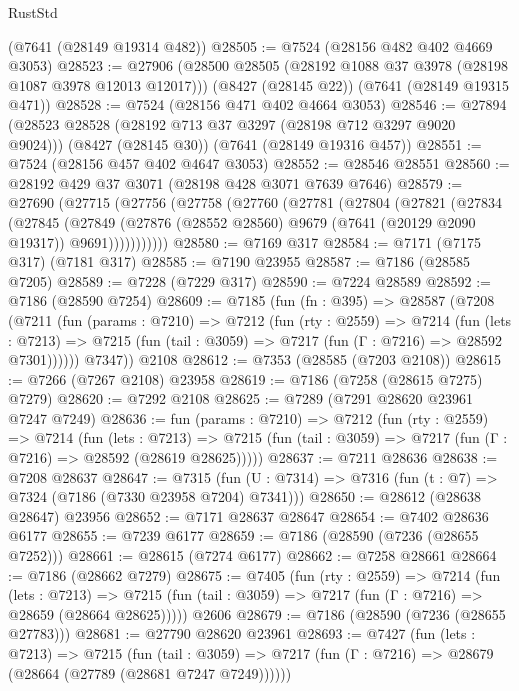 \begin{lexlean}{RustStd}
\begin{coremodule}
{\begin{coremodule}
{{{{{{{{{{{{{{{{{{{{{{{{{{{{{{{{    (@7641 (@28149 @19314 @482))
@28505 := @7524 (@28156 @482 @402 @4669 @3053)
@28523 := @27906
    (@28500 @28505 (@28192 @1088 @37 @3978 (@28198 @1087 @3978 @12013 @12017)))
    (@8427 (@28145 @22))
    (@7641 (@28149 @19315 @471))
@28528 := @7524 (@28156 @471 @402 @4664 @3053)
@28546 := @27894
    (@28523 @28528 (@28192 @713 @37 @3297 (@28198 @712 @3297 @9020 @9024)))
    (@8427 (@28145 @30))
    (@7641 (@28149 @19316 @457))
@28551 := @7524 (@28156 @457 @402 @4647 @3053)
@28552 := @28546 @28551
@28560 := @28192 @429 @37 @3071 (@28198 @428 @3071 @7639 @7646)
@28579 := @27690
    (@27715
      (@27756
        (@27758
          (@27760
            (@27781
              (@27804
                (@27821
                  (@27834
                    (@27845
                      (@27849
                        (@27876 (@28552 @28560) @9679 (@7641 (@20129 @2090 @19317)) @9691)))))))))))
@28580 := @7169 @317
@28584 := @7171 (@7175 @317) (@7181 @317)
@28585 := @7190 @23955
@28587 := @7186 (@28585 @7205)
@28589 := @7228 (@7229 @317)
@28590 := @7224 @28589
@28592 := @7186 (@28590 @7254)
@28609 := @7185
    (fun (fn : @395) =>
    @28587
      (@7208
        (@7211
          (fun (params : @7210) =>
          @7212
            (fun (rty : @2559) =>
            @7214
              (fun (lets : @7213) =>
              @7215 (fun (tail : @3059) => @7217 (fun (Γ : @7216) => @28592 @7301))))))
        @7347))
    @2108
@28612 := @7353 (@28585 (@7203 @2108))
@28615 := @7266 (@7267 @2108) @23958
@28619 := @7186 (@7258 (@28615 @7275) @7279)
@28620 := @7292 @2108
@28625 := @7289 (@7291 @28620 @23961 @7247 @7249)
@28636 := fun (params : @7210) =>
  @7212
    (fun (rty : @2559) =>
    @7214
      (fun (lets : @7213) =>
      @7215 (fun (tail : @3059) => @7217 (fun (Γ : @7216) => @28592 (@28619 @28625)))))
@28637 := @7211 @28636
@28638 := @7208 @28637
@28647 := @7315
    (fun (U : @7314) => @7316 (fun (t : @7) => @7324 (@7186 (@7330 @23958 @7204) @7341)))
@28650 := @28612 (@28638 @28647) @23956
@28652 := @7171 @28637 @28647
@28654 := @7402 @28636 @6177
@28655 := @7239 @6177
@28659 := @7186 (@28590 (@7236 (@28655 @7252)))
@28661 := @28615 (@7274 @6177)
@28662 := @7258 @28661
@28664 := @7186 (@28662 @7279)
@28675 := @7405
    (fun (rty : @2559) =>
    @7214
      (fun (lets : @7213) =>
      @7215 (fun (tail : @3059) => @7217 (fun (Γ : @7216) => @28659 (@28664 @28625)))))
    @2606
@28679 := @7186 (@28590 (@7236 (@28655 @27783)))
@28681 := @27790 @28620 @23961
@28693 := @7427
    (fun (lets : @7213) =>
    @7215
      (fun (tail : @3059) =>
      @7217 (fun (Γ : @7216) => @28679 (@28664 (@27789 (@28681 @7247 @7249))))))
}}}}}}}}}}}}}}}}}}}}}}}}}}}}}}}}
\end{coremodule}}
\end{coremodule}
\end{lexlean}
